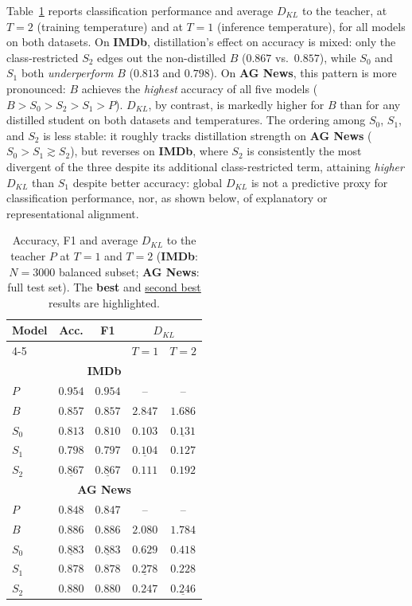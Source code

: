 \documentclass[conference]{IEEEtran}
\begin{document}
Table~\ref{tab:perf} reports classification performance and average $D_{KL}$ to the teacher, at $T=2$ (training temperature) and at $T=1$ (inference temperature), for all models on both datasets. On \textbf{IMDb}, distillation's effect on accuracy is mixed: only the class-restricted $S_2$ edges out the non-distilled $B$ ($0.867$ vs.\ $0.857$), while $S_0$ and $S_1$ both \emph{underperform} $B$ ($0.813$ and $0.798$). On \textbf{AG News}, this pattern is more pronounced: $B$ achieves the \emph{highest} accuracy of all five models ($B>S_0>S_2>S_1>P$). $D_{KL}$, by contrast, is markedly higher for $B$ than for any distilled student on both datasets and temperatures. The ordering among $S_0$, $S_1$, and $S_2$ is less stable: it roughly tracks distillation strength on \textbf{AG News} ($S_0>S_1\gtrsim S_2$), but reverses on \textbf{IMDb}, where $S_2$ is consistently the most divergent of the three despite its additional class-restricted term, attaining \emph{higher} $D_{KL}$ than $S_1$ despite better accuracy: global $D_{KL}$ is not a predictive proxy for classification performance, nor, as shown below, of explanatory or representational alignment.

\begin{table}[tb]
\centering
\caption{Accuracy, F1 and average $D_{KL}$ to the teacher $P$ at $T=1$ and $T=2$ (\textbf{IMDb}: $N=3000$ balanced subset; \textbf{AG News}: full test set). The \textbf{best} and \underline{second best} results are highlighted.}
\small
\begin{tabular}{lcccc}
\toprule
\multirow{2}{*}{Model} & \multirow{2}{*}{Acc.} & \multirow{2}{*}{F1} & \multicolumn{2}{c}{$D_{KL}$} \\
\cmidrule(lr){4-5}
 & & & $T=1$ & $T=2$ \\
\midrule
\multicolumn{5}{c}{\textbf{IMDb}} \\
\midrule
$P$ & $\mathbf{0.954}$ & $\mathbf{0.954}$ & -- & -- \\
$B$ & $0.857$ & $0.857$ & $2.847$ & $1.686$ \\
$S_0$ & $0.813$ & $0.810$ & $\mathbf{0.103}$ & $\underline{0.131}$ \\
$S_1$ & $0.798$ & $0.797$ & $\underline{0.104}$ & $\mathbf{0.127}$ \\
$S_2$ & $\underline{0.867}$ & $\underline{0.867}$ & $0.111$ & $0.192$ \\
\midrule
\multicolumn{5}{c}{\textbf{AG News}} \\
\midrule
$P$ & $0.848$ & $0.847$ & -- & -- \\
$B$ & $\mathbf{0.886}$ & $\mathbf{0.886}$ & $2.080$ & $1.784$ \\
$S_0$ & $\underline{0.883}$ & $\underline{0.883}$ & $0.629$ & $0.418$ \\
$S_1$ & $0.878$ & $0.878$ & $\underline{0.278}$ & $\mathbf{0.228}$ \\
$S_2$ & $0.880$ & $0.880$ & $\mathbf{0.247}$ & $\underline{0.246}$ \\
\bottomrule
\end{tabular}
\label{tab:perf}
\end{table}
\end{document}
